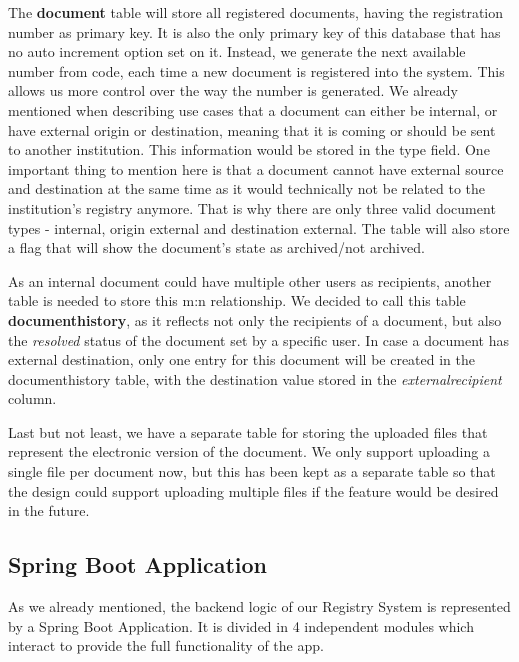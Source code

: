 The \textbf{document} table will store all registered documents, having the registration number as primary key. It is also the only primary key of this database that has no auto increment option set on it. Instead, we generate the next available number from code, each time a new document is registered into the system. This allows us more control over the way the number is generated. We already mentioned when describing use cases that a document can either be internal, or have external origin or destination, meaning that it is coming or should be sent to another institution. This information would be stored in the type field. One important thing to mention here is that a document cannot have external source and destination at the same time as it would technically not be related to the institution's registry anymore. That is why there are only three valid document types - internal, origin external and destination external. The table will also store a flag that will show the document's state as archived/not archived.

As an internal document could have multiple other users as recipients, another table is needed to store this m:n relationship. We decided to call this table \textbf{documenthistory}, as it reflects not only the recipients of a document, but also the \textit{resolved} status of the document set by a specific user. In case a document has external destination, only one entry for this document will be created in the documenthistory table, with the destination value stored in the \textit{externalrecipient} column.

Last but not least, we have a separate table for storing the uploaded files that represent the electronic version of the document. We only support uploading a single file per document now, but this has been kept as a separate table so that the design could support uploading multiple files if the feature would be desired in the future.



\subsection{Spring Boot Application}
\label{subsection:springBootApplication}

As we already mentioned, the backend logic of our Registry System is represented by a Spring Boot Application. It is divided in 4 independent modules which interact to provide the full functionality of the app.

